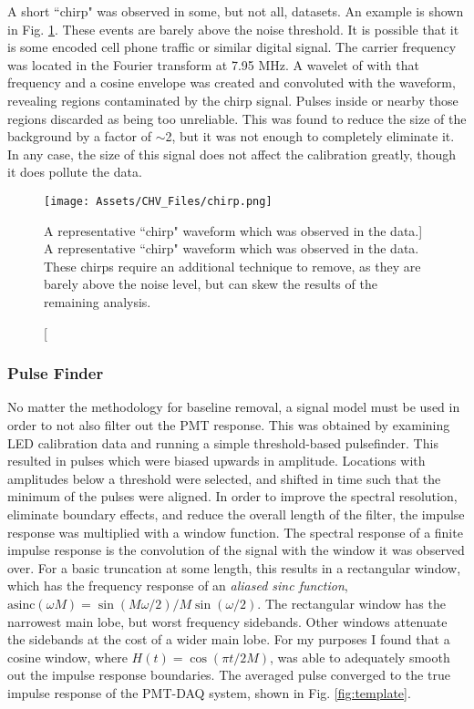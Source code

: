 A short ``chirp" was observed in some, but not all, datasets.
An example is shown in Fig. \ref{fig:chirp}.
These events are barely above the noise threshold.
It is possible that it is some encoded cell phone traffic or similar digital signal.
The carrier frequency was located in the Fourier transform at 7.95 MHz.
A wavelet of with that frequency and a cosine envelope was created and convoluted with the waveform, revealing regions contaminated by the chirp signal.
Pulses inside or nearby those regions discarded as being too unreliable.
This was found to reduce the size of the background by a factor of $\sim$2, but it was not enough to completely eliminate it. 
In any case, the size of this signal does not affect the calibration greatly, though it does pollute the data.

\begin{figure}
    \centering
    \texttt{[image: Assets/CHV\_Files/chirp.png]}
    \caption[A representative ``chirp" waveform which was observed in the data.]%
    {A representative ``chirp" waveform which was observed in the data.
    These chirps require an additional technique to remove, as they are barely above the noise level, but can skew the results of the remaining analysis.}
    \label{fig:chirp}
\end{figure}
\subsubsection{Pulse Finder}
No matter the methodology for baseline removal, a signal model must be used in order to not also filter out the PMT response.
This was obtained by examining LED calibration data and running a simple threshold-based pulsefinder. 
This resulted in pulses which were biased upwards in amplitude.
Locations with amplitudes below a threshold were selected, and shifted in time such that the minimum of the pulses were aligned.
In order to improve the spectral resolution, eliminate boundary effects, and reduce the overall length of the filter, the impulse response was multiplied with a window function.
The spectral response of a finite impulse response is the convolution of the signal with the window it was observed over.
For a basic truncation at some length, this results in a rectangular window, which has the frequency response of an \textit{aliased sinc function}, $\text{asinc}(\omega M) = \sin(M \omega / 2) / M \sin(\omega/2)$.
The rectangular window has the narrowest main lobe, but worst frequency sidebands.
Other windows attenuate the sidebands at the cost of a wider main lobe.
For my purposes I found that a cosine window, where $H(t) = \cos( \pi t/2M)$, was able to adequately smooth out the impulse response boundaries.
The averaged pulse converged to the true impulse response of the PMT-DAQ system, shown in Fig. \ref{fig:template}.

